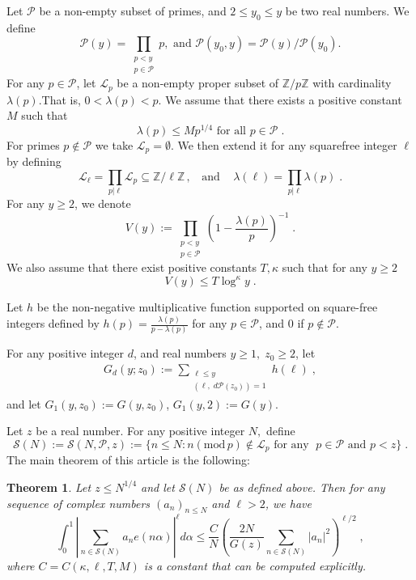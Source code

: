 \documentclass[12pt,article]{amsart}
\newtheorem{theorem}{Theorem}[section]
\theoremstyle{remark}
\numberwithin{equation}{section}
\renewcommand{\pmod}[1]{\left(\mathrm{mod}\,#1\right)}
\newcommand{\Z}{\mathbb{Z}}
\begin{document}
	\vspace{2mm}
	\noindent 
	Let $\mathcal{P}$ be a non-empty subset of primes, and $2\leq y_0\leq y$ be two real numbers. We define  
	$$\mathcal{P}(y)=\prod_{\substack{p<y\\ p\in\mathcal{P}}}p,\text{ and } \mathcal{P}(y_0,y)=\mathcal{P}(y)/\mathcal{P}(y_0).$$
	For any $p\in \mathcal{P}$, let $\mathcal{L}_p$ be a non-empty proper subset of $\Z/p\Z$ with cardinality $\lambda(p)$.That is, $0<\lambda(p)<p$. We assume that there exists a positive constant $M$ such that 
	\begin{equation}
		\tag{H1}\label{H1}
		\lambda(p)\leq M p^{1/4} \text{ for all } p\in\mathcal{P}\;.
	\end{equation} 
	For primes $p\notin\mathcal{P}$ we take $\mathcal{L}_p=\emptyset$. We then extend it for any squarefree integer $\ell$ by defining 
	\[\mathcal{L}_\ell=\prod_{p|\ell}\mathcal{L}_p\subseteq \mathbb{Z}/\ell\mathbb{Z}\,,\; \; \text{ and }  \; \; \; \lambda(\ell)=\prod_{p|\ell}\lambda(p)\;.\]
	For any $y\geq 2$, we denote
	\[V(y):=\prod_{\substack{p<y\\ p\in \mathcal{P}}}\left(1-\frac{\lambda(p)}{p}\right)^{-1}\;.\]
	We also assume that there exist positive constants $T, \kappa$ such that for any $y\geq 2$
	\begin{equation}
		\tag{H2}\label{H2}
		V(y)\leq T \log^\kappa y\;.
	\end{equation}
	
	\vspace{2mm}
	\noindent
	Let $h$ be the non-negative multiplicative function supported on square-free integers defined by  $h(p)=\frac{\lambda(p)}{p-\lambda(p)}$ for any $p\in \mathcal{P}$, and $0$ if $p\notin \mathcal{P}$.  
	
	\vspace{2mm}
	\noindent
	For any positive integer $d$, and real numbers $y\geq 1,\; z_0\geq 2$, let 
	\begin{align*}
		G_d(y;z_0):= \sum_{\substack{\ell\leq y\\ (\ell,\;  d\mathcal{P}(z_0))=1}} h(\ell)\; ,
	\end{align*}
	and let $G_1(y,z_0):=G(y,z_0)$, $G_1(y,2):=G(y)$.
	
	\vspace{2mm}
	\noindent
	Let $z$ be a real number. For any positive integer $N,$  define
	\[\mathcal{S}(N):= \mathcal{S}(N,\mathcal{P}, z):= \{n\leq N: n\pmod{p}\notin \mathcal{L}_p \text{ for any } \; p\in \mathcal{P} \text{ and } p<z\}\;.\]
	The main theorem of this article is the following: 
	\begin{theorem}
		\label{coro}
		Let $z\leq N^{1/4}$ and let $\mathcal{S}(N)$ be as defined above. Then for any sequence of complex numbers $(a_n)_{n\leq N}$ and $\ell>2$, we have 
		\begin{equation}
			\label{rest-est}
			\int_0^1\left|\sum_{n\in \mathcal{S}(N)}a_ne(n\alpha)\right|^{\ell}d\alpha\leq \frac{C}{N} \left(\frac{2N}{G(z)}\sum_{n\in \mathcal{S}(N)}|a_n|^2\right)^{\ell/2}\; ,
		\end{equation}
		where $C=C(\kappa, \ell, T, M)$ is a constant  that can be computed explicitly. 
	\end{theorem}
	
\end{document}
